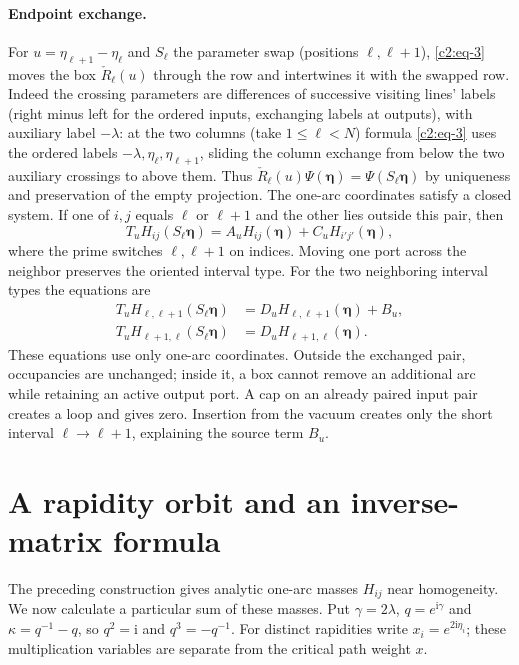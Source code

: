 \paragraph{Endpoint exchange.}
For \(u=\eta_{\ell+1}-\eta_\ell\) and \(S_\ell\) the parameter swap (positions \(\ell,\ell+1\)), \eqref{c2:eq-3} moves the box \(\check R_\ell(u)\) through the row and intertwines it with the swapped row. Indeed the crossing parameters are differences of successive visiting lines' labels (right minus left for the ordered inputs, exchanging labels at outputs), with auxiliary label \(-\lambda\): at the two columns (take \(1\le\ell<N\)) formula \eqref{c2:eq-3} uses the ordered labels \(-\lambda,\eta_\ell,\eta_{\ell+1}\), sliding the column exchange from below the two auxiliary crossings to above them. Thus \(\check R_\ell(u)\Psi(\boldsymbol\eta)=\Psi(S_\ell\boldsymbol\eta)\) by uniqueness and preservation of the empty projection. The one-arc coordinates satisfy a closed system.  If one of \(i,j\) equals \(\ell\) or \(\ell+1\) and the other lies outside this pair, then
\[
 T_u H_{ij}(S_\ell\boldsymbol\eta)= A_u H_{ij}(\boldsymbol\eta)+ C_u H_{i'j'}(\boldsymbol\eta),
\]
where the prime switches \(\ell,\ell+1\) on indices. Moving one port across the neighbor preserves the oriented interval type.
For the two neighboring interval types the equations are
\begin{equation}
 \begin{split}
 T_u H_{\ell,\ell+1}(S_\ell\boldsymbol\eta)&=D_u H_{\ell,\ell+1}(\boldsymbol\eta)+B_u,\\
 T_u H_{\ell+1,\ell}(S_\ell\boldsymbol\eta)&=D_u H_{\ell+1,\ell}(\boldsymbol\eta).
 \end{split}                                                        \label{c2:eq-4}
\end{equation}
These equations use only one-arc coordinates.  Outside the exchanged pair,
occupancies are unchanged; inside it, a box cannot remove an additional
arc while retaining an active output port.  A cap on an already paired
input pair creates a loop and gives zero.  Insertion from the vacuum
creates only the short interval $\ell\to\ell+1$, explaining the source
term $B_u$.


\section{A rapidity orbit and an inverse-matrix formula}\label{sec:orbit}

The preceding construction gives analytic one-arc masses $H_{ij}$ near
homogeneity.  We now calculate a particular sum of these masses.  Put
$\gamma=2\lambda$, $q=e^{\mathrm i\gamma}$ and
$\kappa=q^{-1}-q$, so $q^2=\mathrm i$ and $q^3=-q^{-1}$.  For distinct
rapidities write $x_i=e^{2\mathrm i\eta_i}$; these multiplication
variables are separate from the critical path weight $x$.

